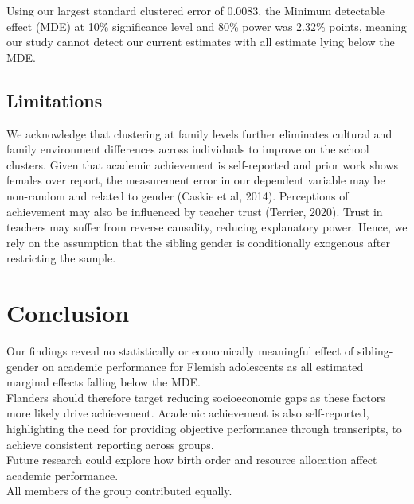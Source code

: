 \documentclass[12pt]{article}
\begin{document}
Using our  largest standard clustered error of 0.0083, the Minimum detectable effect (MDE) at 10\% significance level and 80\% power was 2.32\% points, meaning our study cannot detect our current estimates with all estimate lying below the MDE. 

\subsection{Limitations}

We acknowledge that clustering at family levels further eliminates cultural and family environment differences across individuals to improve on the school clusters. Given that academic achievement is self-reported and prior work shows females over report, the measurement error in our dependent variable may be non-random and related to gender (Caskie et al, 2014). Perceptions of achievement may also be influenced by teacher trust (Terrier, 2020). Trust in teachers may suffer from reverse causality, reducing explanatory power. Hence, we rely on the assumption that the sibling gender is conditionally exogenous after restricting the sample.

\section{Conclusion}

Our findings reveal no statistically or economically meaningful effect of sibling-gender on academic performance for Flemish adolescents as all estimated marginal effects falling below the MDE.\\

Flanders should therefore target reducing socioeconomic gaps as these factors more likely drive achievement. Academic achievement is also self-reported, highlighting the need for providing objective performance through transcripts, to achieve consistent reporting across groups.\\

Future research could explore how birth order and resource allocation affect academic performance. \\

All members of the group contributed equally.

\pagebreak
\end{document}
